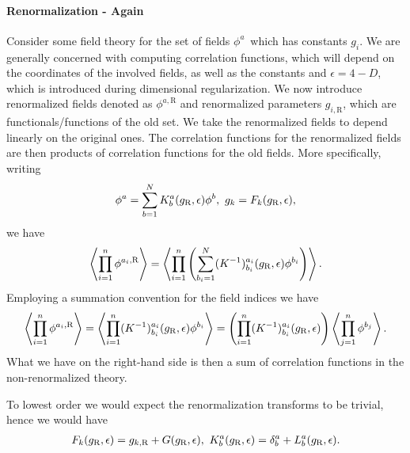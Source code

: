\paragraph{Renormalization - Again}
Consider some field theory for the set of fields $\phi^{a}$ which has constants $g_{i}$. We are generally concerned with computing correlation functions, which will depend on the coordinates of the involved fields, as well as the constants and $\epsilon = 4 - D$, which is introduced during dimensional regularization. We now introduce renormalized fields denoted as $\phi^{a, \text{R}}$ and renormalized parameters $g_{i, \text{R}}$, which are functionals/functions of the old set. We take the renormalized fields to depend linearly on the original ones. The correlation functions for the renormalized fields are then products of correlation functions for the old fields. More specifically, writing
\begin{align*}
	\phi^{a} = \sum\limits_{b = 1}^{N}K_{b}^{a}(g_{\text{R}}, \epsilon)\phi^{b},\ g_{k} = F_{k}(g_{\text{R}}, \epsilon),
\end{align*}
we have
\begin{align*}
	\expval{\prod\limits_{i = 1}^{n}\phi^{a_{i}, \text{R}}} = \expval{\prod\limits_{i = 1}^{n}\left(\sum\limits_{b_{i} = 1}^{N}(K^{-1})_{b_{i}}^{a_{i}}(g_{\text{R}}, \epsilon)\phi^{b_{i}}\right)}.
\end{align*}
Employing a summation convention for the field indices we have
\begin{align*}
	\expval{\prod\limits_{i = 1}^{n}\phi^{a_{i}, \text{R}}} = \expval{\prod\limits_{i = 1}^{n}(K^{-1})_{b_{i}}^{a_{i}}(g_{\text{R}}, \epsilon)\phi^{b_{i}}} = \left(\prod\limits_{i = 1}^{n}(K^{-1})_{b_{i}}^{a_{i}}(g_{\text{R}}, \epsilon)\right)\expval{\prod\limits_{j = 1}^{n}\phi^{b_{j}}}.
\end{align*}
What we have on the right-hand side is then a sum of correlation functions in the non-renormalized theory.

To lowest order we would expect the renormalization transforms to be trivial, hence we would have
\begin{align*}
	F_{k}(g_{\ren}, \epsilon) = g_{k, \ren} + G(g_{\ren}, \epsilon),\ K^{a}_{b}(g_{\ren}, \epsilon) = \kdelta{a}{b} + L^{a}_{b}(g_{\ren}, \epsilon).
\end{align*}


